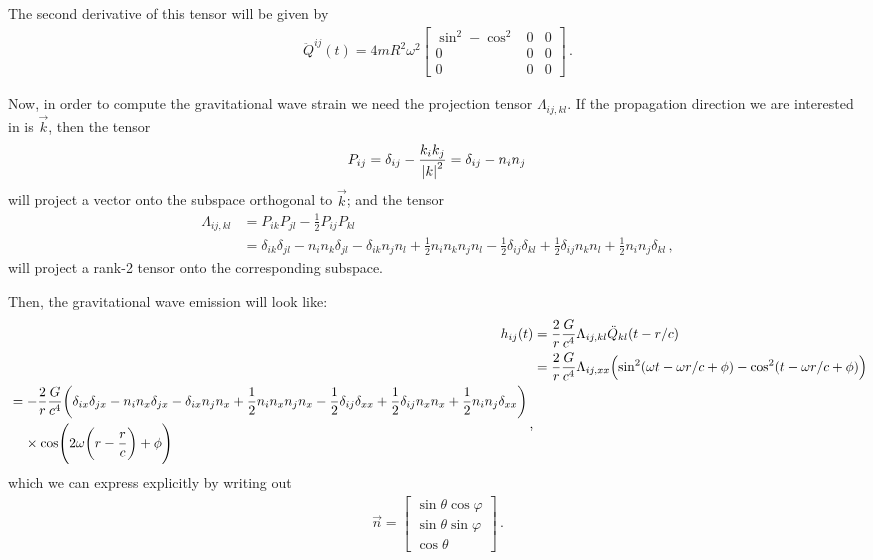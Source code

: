 \documentclass[main.tex]{subfiles}
\begin{document}
The second derivative of this tensor will be given by 
%
\begin{align}
\ddot{Q}^{ij}(t) = 4 m R^2 \omega^2 
\left[\begin{array}{ccc}
\sin^2 - \cos^2 & 0  & 0\\ 
0 & 0  & 0 \\
0 & 0 & 0
\end{array}\right]
\,.
\end{align}

 

Now, in order to compute the gravitational wave strain we need the projection tensor \(\Lambda_{ij, kl}\).
If the propagation direction we are interested in is \(\vec{k}\), then the tensor 
%
\begin{align}
P_{ij} = \delta_{ij} - \frac{k_i k_j}{\abs{k}^2} = \delta_{ij} - n_i n_j
\,
\end{align}
%
will project a vector onto the subspace orthogonal to \(\vec{k}\); and the tensor 
%
\begin{align}
\Lambda_{ij, kl} &= P_{ik} P_{jl} - \frac{1}{2} P_{ij} P_{kl}  \\
&= \delta_{ik} \delta_{jl} - n_i n_k \delta_{jl} - \delta_{ik} n_j n_l + \frac{1}{2} n_{i} n_k n_j n_l - \frac{1}{2} \delta_{ij} \delta_{kl} + \frac{1}{2} \delta_{ij} n_k n_l + \frac{1}{2} n_i n_j \delta_{kl} 
\,,
\end{align}
%
will project a rank-2 tensor onto the corresponding subspace. 

Then, the gravitational wave emission will look like: 
%
\begin{align}
h_{ij} (t) &= \frac{2}{r} \frac{G}{c^{4}} \Lambda_{ij, kl} \ddot{Q}_{kl} (t - r/ c)  \\
&= \frac{2}{r} \frac{G}{c^{4}} \Lambda_{ij, xx} 
\qty(\sin^2 (\omega t -  \omega r/c + \phi ) - \cos^2 (t - \omega r/c + \phi ))  \\
\begin{split}
&= -\frac{2}{r} \frac{G}{c^{4}} 
\qty(\delta_{ix} \delta_{jx} - n_i n_x \delta_{jx} - \delta_{ix} n_j n_x + \frac{1}{2} n_{i} n_x n_j n_x - \frac{1}{2} \delta_{ij} \delta_{xx} + \frac{1}{2} \delta_{ij} n_x n_x + \frac{1}{2} n_i n_j \delta_{xx} ) \\
&\phantom{=}\ 
\times \cos(2 \omega \qty(r - \frac{r}{c}) + \phi )
\end{split}
\,,
\end{align}
%
which we can express explicitly by writing out 
%
\begin{align}
\vec{n} = \left[\begin{array}{c}
\sin \theta \cos \varphi  \\ 
\sin \theta \sin \varphi  \\ 
\cos \theta 
\end{array}\right]
\,.
\end{align}
\end{document}

